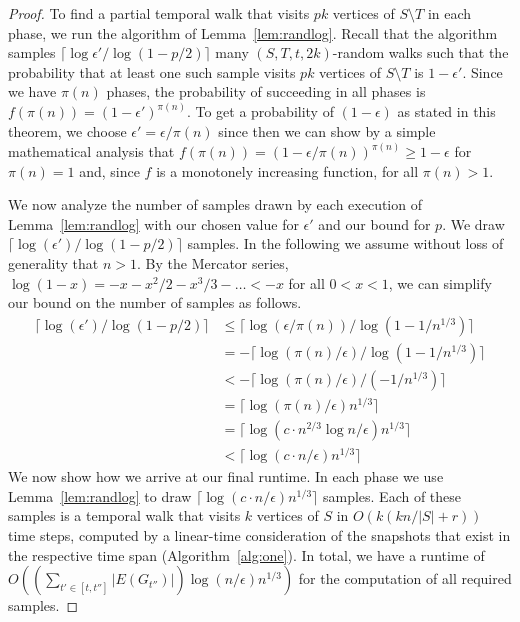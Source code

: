 {\begin{proof}
    To find a partial temporal walk that visits $pk$ vertices {of $S\setminus T$} in each phase, we
    run the algorithm of Lemma~\ref{lem:randlog}. Recall that the algorithm
    samples {$\lceil \log \epsilon'/\log(1-p/2) \rceil$ many $(S, T, t, 2k)$-random
    walks} such that the
    probability that at least one such sample visits $pk$ vertices of $S\setminus T$ is $1 -
    \epsilon'$. Since we have $\pi(n)$ phases, {the probability of succeeding 
    in all}
    phases is $f(\pi(n))=(1-\epsilon')^{\pi(n)}$. 
    To get a probability of {$(1-\epsilon)$ as stated in this theorem}, we 
    choose
    $\epsilon'=\epsilon/\pi(n)$ since then we can show by a simple mathematical
    analysis that 
    $f(\pi(n))=(1-\epsilon/\pi(n))^{\pi(n)} \geq 1-\epsilon$ for $\pi(n)
    = 1$ and, since $f$ is a monotonely increasing function, for all $\pi(n) >
    1$.


    We now analyze the number of samples drawn by each execution of
    Lemma~\ref{lem:randlog} with our chosen value for $\epsilon'$ and our bound
    for $p$. We {draw $\lceil \log (\epsilon')/\log(1-p/2) \rceil$} %
    samples.
    {In the following we assume without loss of generality that $n>1$}. By the Mercator series, $\log (1-x) = -x -x^2/2 -x^3/3 - \ldots< -x$ for all 
    $0<x<1$, we can simplify our bound on the number of samples as follows. 
    \begin{align*}
         \lceil \log (\epsilon')/\log({1-p/2}) \rceil &\leq \lceil \log (\epsilon/\pi(n))/\log(1-1/n^{1/3})\rceil\\
                                              &= - \lceil \log (\pi(n)/\epsilon)/\log(1-1/n^{1/3})\rceil\\
                                                 &< - \lceil \log (\pi(n)/\epsilon)/(-1/n^{1/3})\rceil\\
                                                 &=  \lceil \log (\pi(n)/\epsilon)n^{1/3} \rceil\\
                                                 &=  \lceil \log (c \cdot n^{2/3} \log n/\epsilon) n^{1/3} \rceil\\
                                                 &{< \lceil \log (c \cdot n/\epsilon) n^{1/3} \rceil}
    \end{align*}
    We now show how we arrive at our final runtime. In each phase we use
    Lemma~\ref{lem:randlog} to draw {$\lceil \log (c \cdot n/\epsilon) n^{1/3} \rceil$} samples. Each of
    these samples is a temporal walk that visits $k$ vertices of $S$ in $O(k(k
    n/|S|+r))$ time steps, computed by a linear-time {consideration} of the snapshots that
    exist in the respective time span {(Algorithm~\ref{alg:one})}. In total, we have a runtime of
    $O((\sum_{t' \in [t, t'']} |E(G_{t''})|) \log(n/\epsilon) n^{1/3})$ for the
    computation of all required samples. 
\end{proof}


}
